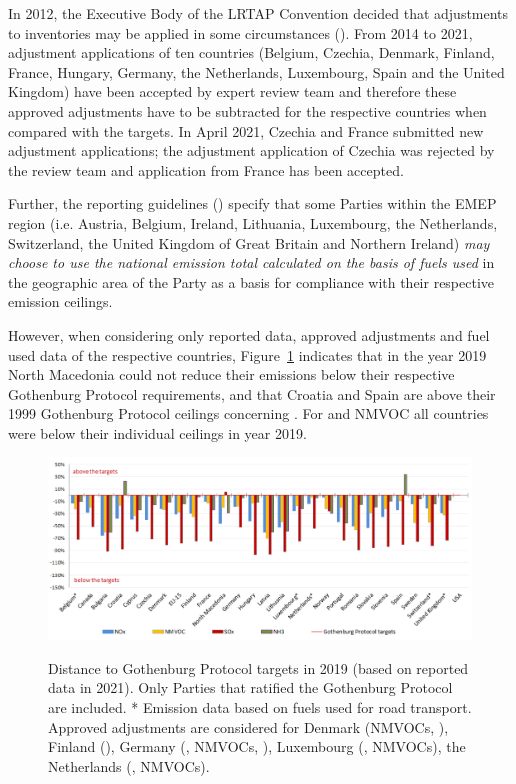 In 2012, the Executive Body of the LRTAP Convention decided that adjustments to inventories may be applied in some circumstances (\cite{UNECE2012}). From 2014 to 2021, adjustment applications of ten countries (Belgium, Czechia, Denmark, Finland, France, Hungary, Germany, the Netherlands, Luxembourg, Spain and the United Kingdom) have been accepted by expert review team and therefore these approved adjustments have to be subtracted for the respective countries when compared with the targets. In April 2021, Czechia and France  submitted  new adjustment applications; the \nhiii adjustment application  of Czechia was rejected by the review team and application from France has been accepted.     

Further, the reporting guidelines (\cite{UNECE2014}) specify that some Parties within the EMEP region (i.e. Austria, Belgium, Ireland, Lithuania, Luxembourg, the Netherlands, Switzerland, the United Kingdom of Great Britain and Northern Ireland) {\it may choose to use the national emission total calculated on the basis of fuels used} in the geographic area of the Party as a basis for compliance with their respective emission ceilings.

However, when considering only reported data, approved adjustments and fuel used data of the respective countries, Figure~\ref{fig:CEIP4} indicates that in the year 2019 North Macedonia could not reduce their \sox emissions below their respective Gothenburg Protocol requirements, and that Croatia and Spain are above their 1999 Gothenburg Protocol ceilings concerning \nhiii. For \nox and NMVOC all countries were below their individual ceilings in year 2019.


\begin{figure}[h]
\centering
{\includegraphics*[viewport=1 1 753 323,clip,scale=0.55]{FIGS_CEIP/Fig4.pdf}}
\caption{Distance to Gothenburg Protocol targets in 2019 (based on reported data in 2021).
  Only Parties that ratified the Gothenburg Protocol are included. 
  * Emission data based on fuels used for road transport.
Approved adjustments are considered for  Denmark (NMVOCs, \nhiii), Finland (\nhiii),  Germany (\nox, NMVOCs, \nhiii), Luxembourg (\nox, NMVOCs), the Netherlands (\nhiii, NMVOCs).}
\label{fig:CEIP4}
\end{figure}





